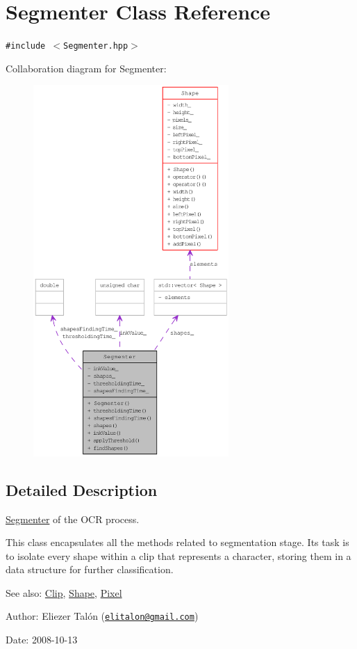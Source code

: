 \hypertarget{class_segmenter}{
\section{Segmenter Class Reference}
\label{class_segmenter}
}
{\tt \#include $<$Segmenter.hpp$>$}

Collaboration diagram for Segmenter:\nopagebreak
\begin{figure}[H]
\begin{center}
\leavevmode
\includegraphics[height=400pt]{class_segmenter__coll__graph}
\end{center}
\end{figure}


\subsection{Detailed Description}
\hyperlink{class_segmenter}{Segmenter} of the OCR process. 

This class encapsulates all the methods related to segmentation stage. Its task is to isolate every shape within a clip that represents a character, storing them in a data structure for further classification.

\begin{Desc}
\item[See also:]\hyperlink{class_clip}{Clip}, \hyperlink{class_shape}{Shape}, \hyperlink{_pixel_8hpp_535e59456e3e633842529cfa8ea103c4}{Pixel}\end{Desc}
\begin{Desc}
\item[Author:]Eliezer Talón (\href{mailto:elitalon@gmail.com}{\tt elitalon@gmail.com}) \end{Desc}
\begin{Desc}
\item[Date:]2008-10-13 \end{Desc}


